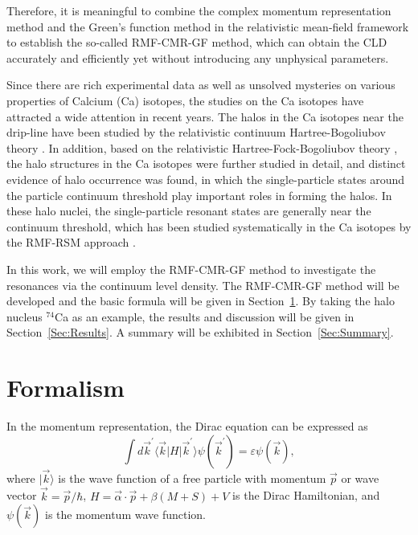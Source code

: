 \documentclass[twocolumn,prc,preprintnumbers,superscriptaddress,floatfix,showpacs]{revtex4}
\begin{document}
Therefore, it is meaningful to combine the complex momentum representation method and the Green's function method in the relativistic mean-field framework to establish the so-called RMF-CMR-GF method, which can obtain the CLD accurately and efficiently yet without introducing any unphysical parameters.

Since there are rich experimental data as well as unsolved mysteries on various properties of Calcium (Ca) isotopes, the studies on the Ca isotopes have attracted a wide attention in recent years. The halos in the Ca isotopes near the drip-line have been studied by the relativistic continuum Hartree-Bogoliubov theory \cite{Meng2002}. In addition, based on the relativistic Hartree-Fock-Bogoliubov theory \cite{Long2010}, the halo structures in the Ca isotopes were further studied in detail, and distinct evidence of halo occurrence was found, in which the single-particle states around the particle continuum threshold play important roles in forming the halos. In these halo nuclei, the single-particle resonant states are generally near the continuum threshold, which has been studied systematically in the Ca isotopes by the RMF-RSM approach \cite{Zhang2010}.

In this work, we will employ the RMF-CMR-GF method to investigate the resonances via the continuum level density. The RMF-CMR-GF method will be developed and the basic formula will be given in Section~\ref{Sec:Formalism}. By taking the halo nucleus $^{74}$Ca as an example, the results and discussion will be given in Section~\ref{Sec:Results}. A summary will be exhibited in Section~\ref{Sec:Summary}.


\section{Formalism}\label{Sec:Formalism}

In the momentum representation, the Dirac equation can be expressed as \cite{Li2016}
\begin{equation}\label{Diraceq2}
\int d\vec{k}^{\prime }\langle \vec{k}\vert H\vert \vec{k}^{\prime }\rangle \psi ( \vec{k}^{\prime }) =\varepsilon
\psi ( \vec{k}),
\end{equation}%
where $\vert \vec{k}\rangle $ is the wave function of a free particle with momentum $\vec{p}$ or wave vector $\vec{k} = \vec{p}/\hbar $, $H = \vec{\alpha}\cdot\vec{p}+\beta \left( M+S\right) +V$ is the Dirac Hamiltonian, and $\psi( \vec{k}) $ is the momentum wave function.
\end{document}
